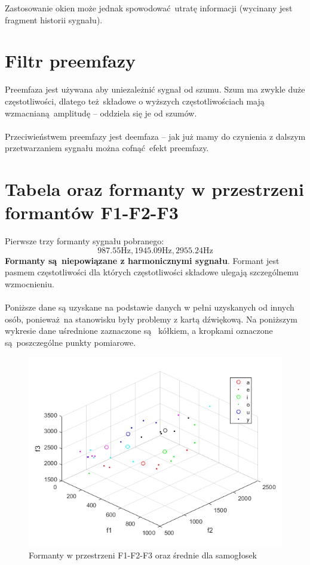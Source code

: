 \documentclass[a4paper, 12pt, titlepage]{article}
\begin{document}
        Zastosowanie okien może jednak spowodować utratę informacji
        (wycinany jest fragment historii sygnału).
    \section{Filtr preemfazy}
        Preemfaza jest używana aby uniezależnić sygnał od szumu. Szum ma zwykle
        duże częstotliwości, dlatego też składowe o wyższych częstotliwościach 
        mają wzmacnianą amplitudę -- oddziela się je od szumów. 
        \\ \\
        Przeciwieństwem preemfazy jest deemfaza -- jak już mamy do czynienia z 
        dalszym przetwarzaniem sygnału można cofnąć efekt preemfazy.
    \section{Tabela oraz formanty w przestrzeni formantów F1-F2-F3}
        Pierwsze trzy formanty sygnału pobranego:
        $$
            987.55\mathrm{Hz}, \mathrm{1945.09Hz}, \mathrm{2955.24Hz}
        $$
        \textbf{Formanty są niepowiązane z harmonicznymi sygnału}. Formant 
        jest pasmem częstotliwości dla których częstotliwości składowe
        ulegają szczególnemu wzmocnieniu.
        \\ \\
        Poniższe dane są uzyskane na podstawie danych w pełni uzyskanych
        od innych osób, ponieważ na stanowisku były problemy z kartą
        dźwiękową. Na poniższym wykresie dane uśrednione zaznaczone są 
        kółkiem, a kropkami oznaczone są poszczególne punkty pomiarowe.
        \begin{figure}[H]
            \centering
            \includegraphics[width=0.8\linewidth]{clusters_correct.png}
            \caption{Formanty w przestrzeni F1-F2-F3 oraz średnie dla
                samogłosek}
        \end{figure}
\end{document}
